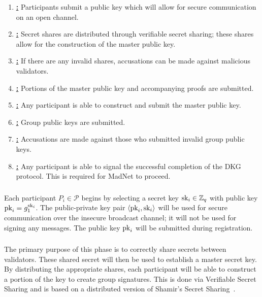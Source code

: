 \begin{enumerate}
\item \hyperref[sssec:registration]{\textbf{\Registration{}:}}
    Participants submit a public key
    which will allow for secure communication on an open channel.
\item \hyperref[sssec:share_distribution]{\textbf{\ShareDistribution{}:}}
    Secret shares are distributed
    through verifiable secret sharing;
    these shares allow for the construction of the master public key.
\item \hyperref[sssec:share_distribution_dispute]{\textbf{\ShareDistributionDispute{}:}}
    If there are any invalid shares,
    accusations can be made against malicious validators.
\item \hyperref[sssec:key_share_submission]{\textbf{\KeyShare{}:}}
    Portions of the master public key and accompanying
    proofs are submitted.
\item \hyperref[sssec:mpk_submission]{\textbf{\MasterPublicKey{}:}}
    Any participant is able to construct and submit
    the master public key.
\item \hyperref[sssec:gpkj_submission]{\textbf{\GPKSubmission{}:}}
    Group public keys are submitted.
\item \hyperref[sssec:gpkj_dispute]{\textbf{\GPKDispute{}:}}
    Accusations are made against those who submitted invalid
    group public keys.
\item \hyperref[sssec:gpkj_complete]{\textbf{\Completion{}:}}
    Any participant is able to signal the successful completion
    of the DKG protocol.
    This is required for MadNet to proceed.
\end{enumerate}



\subsubsection{\Registration{}}
\label{sssec:registration}
Each participant $P_{i}\in\mathcal{P}$ begins by selecting
a secret key $\textrm{sk}_{i}\in\mathbb{Z}_{q}$ with public key $\textrm{pk}_{i} = g_{1}^{\textrm{sk}_{i}}$.
The public-private key pair $\left\langle \textrm{pk}_{i},\textrm{sk}_{i} \right\rangle$ will be
used for secure communication over the insecure broadcast channel;
it will not be used for signing any messages.
The public key $\textrm{pk}_{i}$ will be submitted during registration.



\subsubsection{\ShareDistribution{}}
\label{sssec:share_distribution}
The primary purpose of this phase is to correctly share secrets
between validators.
These shared secret will then be used to establish a master secret key.
By distributing the appropriate shares,
each participant will be able to construct a portion
of the key to create group signatures.
This is done via Verifiable Secret Sharing
and is based on a distributed version of
Shamir's Secret Sharing~\cite{shamir1979share}.

